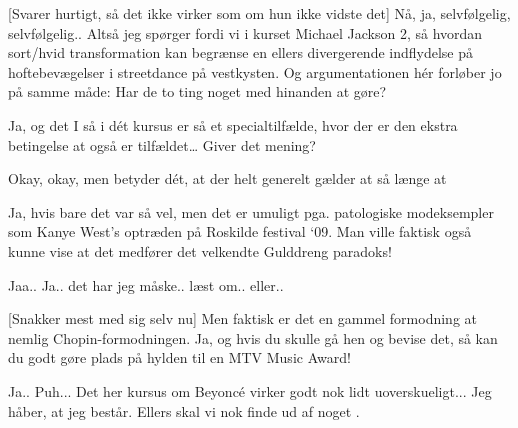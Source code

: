 \documentclass[a4paper,11pt]{article}
\begin{document}
\begin{sketch}
[Svarer hurtigt, så det ikke virker som om hun ikke vidste det] Nå, ja, selvfølgelig, selvfølgelig.. Altså jeg spørger fordi vi i kurset Michael Jackson 2, så hvordan sort/hvid transformation kan begrænse en ellers divergerende indflydelse på hoftebevægelser  i streetdance på vestkysten. Og argumentationen hér forløber jo på samme måde: Har de to ting noget med hinanden at gøre?

 Ja, og det I så i dét kursus er så et specialtilfælde, hvor der er den ekstra betingelse at  også er tilfældet… Giver det mening? 

  Okay, okay, men betyder dét, at der helt generelt gælder at  så længe at 

  Ja, hvis bare det var så vel, men det er umuligt pga. patologiske modeksempler som Kanye West’s optræden på Roskilde festival ‘09. Man ville faktisk også kunne vise at det medfører det velkendte Gulddreng paradoks!

  Jaa.. Ja.. det har jeg måske.. læst om.. eller..

[Snakker mest med sig selv nu] Men faktisk er det en gammel formodning at  nemlig Chopin-formodningen.  Ja, og hvis du skulle gå hen og bevise det, så kan du godt gøre plads på hylden til en MTV Music Award!

 Ja.. Puh... Det her kursus om Beyoncé virker godt nok lidt uoverskueligt... Jeg håber, at jeg består.
  Ellers skal vi nok finde ud af noget . 






\end{sketch}
\end{document}
